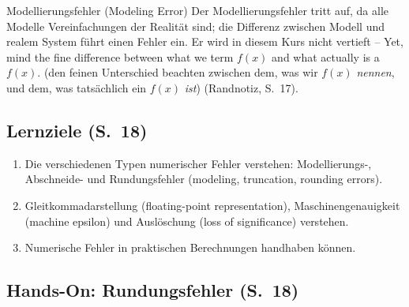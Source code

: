 \begin{defbox}{Modellierungsfehler (Modeling Error)}
Der Modellierungsfehler tritt auf, da alle Modelle Vereinfachungen der Realität sind; die Differenz zwischen Modell und realem System führt einen Fehler ein. Er wird in diesem Kurs nicht vertieft -- \glqq Yet, mind the fine difference between what we term $f(x)$ and what actually is a $f(x)$.\grqq{} (den feinen Unterschied beachten zwischen dem, was wir $f(x)$ \emph{nennen}, und dem, was tatsächlich ein $f(x)$ \emph{ist}) (Randnotiz, S.~17).
\end{defbox}

\subsection{Lernziele (S.~18)}

\begin{enumerate}[itemsep=1pt]
  \item Die verschiedenen Typen numerischer Fehler verstehen: Modellierungs-, Abschneide- und Rundungsfehler (modeling, truncation, rounding errors).
  \item Gleitkommadarstellung (floating-point representation), Maschinengenauigkeit (machine epsilon) und Auslöschung (loss of significance) verstehen.
  \item Numerische Fehler in praktischen Berechnungen handhaben können.
\end{enumerate}

\subsection{Hands-On: Rundungsfehler (S.~18)}

